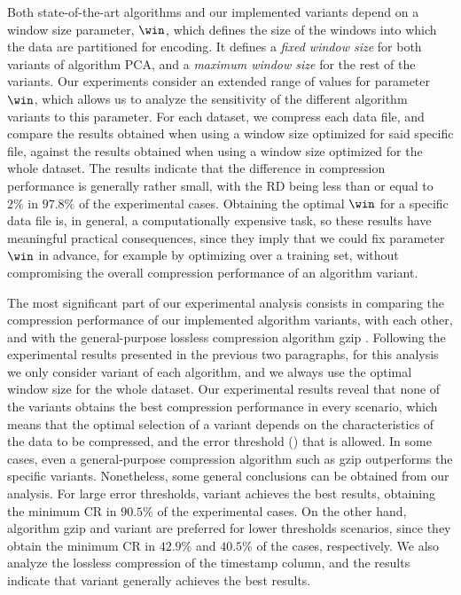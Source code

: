 Both state-of-the-art algorithms and our implemented variants depend on a window size parameter, $\win$, which defines the size of the windows into which the data are partitioned for encoding. It defines a \textit{fixed window size} for both variants of algorithm PCA, and a \textit{maximum window size} for the rest of the variants. Our experiments consider an extended range of values for parameter $\win$, which allows us to analyze the sensitivity of the different algorithm variants to this parameter. For each dataset, we compress each data file, and compare the results obtained when using a window size optimized for said specific file, against the results obtained when using a window size optimized for the whole dataset. The results indicate that the difference in compression performance is generally rather small, with the RD being less than or equal to $2\%$ in $97.8\%$ of the experimental cases. Obtaining the optimal $\win$ for a specific data file is, in general, a computationally expensive task, so these results have meaningful practical consequences, since they imply that we could fix parameter $\win$ in advance, for example by optimizing over a training set, without compromising the overall compression performance of an algorithm variant. 


The most significant part of our experimental analysis consists in comparing the compression performance of our implemented algorithm variants, with each other, and with the general-purpose lossless compression algorithm gzip \cite{gzip}. Following the experimental results presented in the previous two paragraphs, for this analysis we only consider variant \maskalgo of each algorithm, and we always use the optimal window size for the whole dataset. Our experimental results reveal that none of the variants obtains the best compression performance in every scenario, which means that the optimal selection of a variant depends on the characteristics of the data to be compressed, and the error threshold (\maxerror) that is allowed. In some cases, even a general-purpose compression algorithm such as gzip outperforms the specific variants. Nonetheless, some general conclusions can be obtained from our analysis. For large error thresholds, variant  achieves the best results, obtaining the minimum CR in $90.5\%$ of the experimental cases. On the other hand, algorithm gzip and variant  are preferred for lower thresholds scenarios, since they obtain the minimum CR in $42.9\%$ and $40.5\%$ of the cases, respectively. We also analyze the lossless compression of the timestamp column, and the results indicate that variant  generally achieves the best results.


